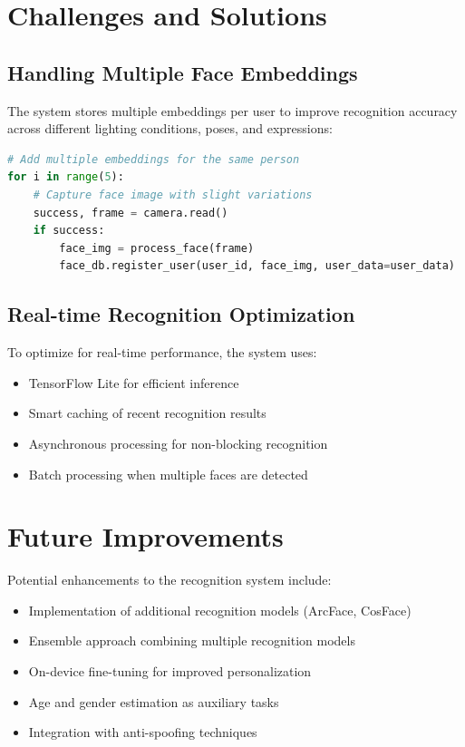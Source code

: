 \section{Challenges and Solutions}

\subsection{Handling Multiple Face Embeddings}
The system stores multiple embeddings per user to improve recognition accuracy across different lighting conditions, poses, and expressions:

\begin{lstlisting}[language=Python]
# Add multiple embeddings for the same person
for i in range(5):
    # Capture face image with slight variations
    success, frame = camera.read()
    if success:
        face_img = process_face(frame)
        face_db.register_user(user_id, face_img, user_data=user_data)
\end{lstlisting}

\subsection{Real-time Recognition Optimization}
To optimize for real-time performance, the system uses:

\begin{itemize}
    \item TensorFlow Lite for efficient inference
    \item Smart caching of recent recognition results
    \item Asynchronous processing for non-blocking recognition
    \item Batch processing when multiple faces are detected
\end{itemize}

\section{Future Improvements}
Potential enhancements to the recognition system include:

\begin{itemize}
    \item Implementation of additional recognition models (ArcFace, CosFace)
    \item Ensemble approach combining multiple recognition models
    \item On-device fine-tuning for improved personalization
    \item Age and gender estimation as auxiliary tasks
    \item Integration with anti-spoofing techniques
\end{itemize}